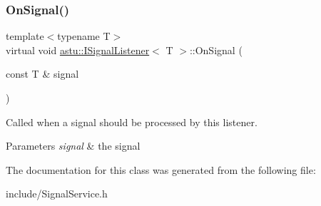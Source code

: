\subsubsection{\texorpdfstring{On\+Signal()}{OnSignal()}}
{\footnotesize\ttfamily template$<$typename T$>$ \\
virtual void \hyperlink{classastu_1_1ISignalListener}{astu\+::\+I\+Signal\+Listener}$<$ T $>$\+::On\+Signal (\begin{DoxyParamCaption}\item[{const T \&}]{signal }\end{DoxyParamCaption})\hspace{0.3cm}{\ttfamily [pure virtual]}}

Called when a signal should be processed by this listener.


\begin{DoxyParams}{Parameters}
{\em signal} & the signal \\
\hline
\end{DoxyParams}


The documentation for this class was generated from the following file\+:\begin{DoxyCompactItemize}
\item 
include/Signal\+Service.\+h\end{DoxyCompactItemize}
